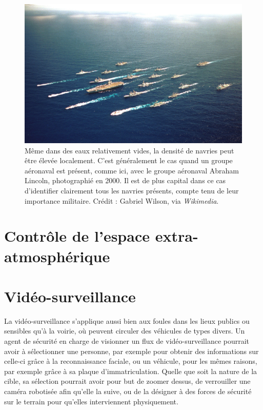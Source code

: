 	\begin{figure}[htb]
		\centering
		\includegraphics[width=\textwidth]{figures/lincoln}
		\caption{Même dans des eaux relativement vides, la densité de navries peut être élevée localement. C'est généralement le cas quand un groupe aéronaval est présent, comme ici, avec le groupe aéronaval Abraham Lincoln, photographié en 2000. Il est de plus capital dans ce cas d'identifier clairement tous les navries présents, compte tenu de leur importance militaire. Crédit : Gabriel Wilson, via \emph{Wikimedia}.}
		\label{fig:lincoln}
	\end{figure}
	
	\section{Contrôle de l'espace extra-atmosphérique}
	
	\section{Vidéo-surveillance}
	La vidéo-surveillance s'applique aussi bien aux foules dans les lieux publics ou sensibles qu'à la voirie, où peuvent circuler des véhicules de types divers. Un agent de sécurité en charge de visionner un flux de vidéo-surveillance pourrait avoir à sélectionner une personne, par exemple pour obtenir des informations sur celle-ci grâce à la reconnaissance faciale, ou un véhicule, pour les mêmes raisons, par exemple grâce à sa plaque d'immatriculation. Quelle que soit la nature de la cible, sa sélection pourrait avoir pour but de zoomer dessus, de verrouiller une caméra robotisée afin qu'elle la suive, ou de la désigner à des forces de sécurité sur le terrain pour qu'elles interviennent physiquement.
	
